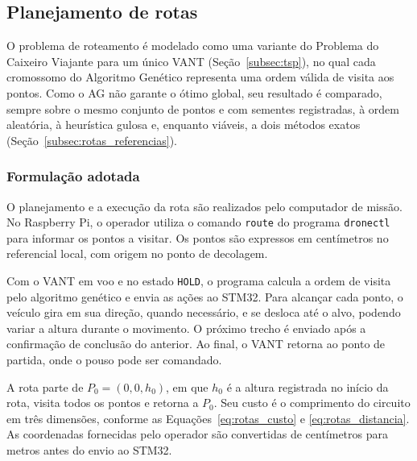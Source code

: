 
\subsection{Planejamento de rotas}\label{subsec:metodo_rotas}

O problema de roteamento é modelado como uma variante do Problema do Caixeiro Viajante para um único VANT (Seção~\ref{subsec:tsp}), no qual cada cromossomo do Algoritmo Genético representa uma ordem válida de visita aos pontos. Como o AG não garante o ótimo global, seu resultado é comparado, sempre sobre o mesmo conjunto de pontos e com sementes registradas, à ordem aleatória, à heurística gulosa e, enquanto viáveis, a dois métodos exatos (Seção~\ref{subsec:rotas_referencias}).

\subsubsection{Formulação adotada}\label{subsubsec:rotas_formulacao_adotada}

O planejamento e a execução da rota são realizados pelo computador de missão. No Raspberry Pi, o operador utiliza o comando \texttt{route} do programa \texttt{dronectl} para informar os pontos a visitar. Os pontos são expressos em centímetros no referencial local, com origem no ponto de decolagem.

Com o VANT em voo e no estado \texttt{HOLD}, o programa calcula a ordem de visita pelo algoritmo genético e envia as ações ao STM32. Para alcançar cada ponto, o veículo gira em sua direção, quando necessário, e se desloca até o alvo, podendo variar a altura durante o movimento. O próximo trecho é enviado após a confirmação de conclusão do anterior. Ao final, o VANT retorna ao ponto de partida, onde o pouso pode ser comandado.

A rota parte de $P_0 = (0, 0, h_0)$, em que $h_0$ é a altura registrada no início da rota, visita todos os pontos e retorna a $P_0$. Seu custo é o comprimento do circuito em três dimensões, conforme as Equações~\ref{eq:rotas_custo} e \ref{eq:rotas_distancia}. As coordenadas fornecidas pelo operador são convertidas de centímetros para metros antes do envio ao STM32.

